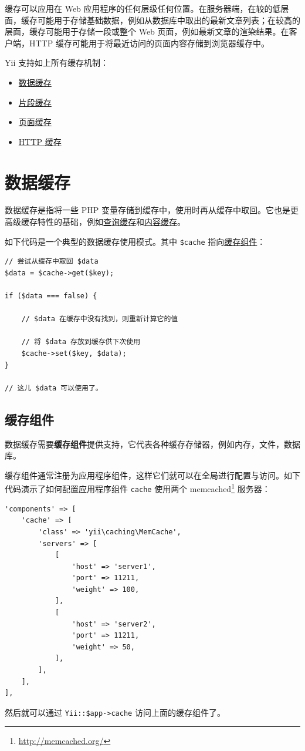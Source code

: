 缓存可以应用在 Web 应用程序的任何层级任何位置。在服务器端，在较的低层面，缓存可能用于存储基础数据，例如从数据库中取出的最新文章列表；在较高的层面，缓存可能用于存储一段或整个 Web 页面，例如最新文章的渲染结果。在客户端，HTTP 缓存可能用于将最近访问的页面内容存储到浏览器缓存中。

Yii 支持如上所有缓存机制：

\begin{itemize}
\item \hyperref[caching-data.md]{数据缓存}
\item \hyperref[caching-fragment.md]{片段缓存}
\item \hyperref[caching-page.md]{页面缓存}
\item \hyperref[caching-http.md]{HTTP 缓存}
\end{itemize}


\label{caching-data.md}\section{数据缓存}
数据缓存是指将一些 PHP 变量存储到缓存中，使用时再从缓存中取回。它也是更高级缓存特性的基础，例如\hyperref[caching-data.md::::query-caching]{查询缓存}和\hyperref[caching-content.md]{内容缓存}。

如下代码是一个典型的数据缓存使用模式。其中 \lstinline|$cache| 指向\hyperref[caching-data.md::::cache-components]{缓存组件}：

\lstset{language=php}\begin{lstlisting}
// 尝试从缓存中取回 $data 
$data = $cache->get($key);

if ($data === false) {

    // $data 在缓存中没有找到，则重新计算它的值

    // 将 $data 存放到缓存供下次使用
    $cache->set($key, $data);
}

// 这儿 $data 可以使用了。
\end{lstlisting}
\subsection{缓存组件 \label{caching-data.md::cache-components}}
数据缓存需要\textbf{缓存组件}提供支持，它代表各种缓存存储器，例如内存，文件，数据库。

缓存组件通常注册为应用程序组件，这样它们就可以在全局进行配置与访问。如下代码演示了如何配置应用程序组件 \lstinline|cache| 使用两个 memcached\footnote{\url{http://memcached.org/}} 服务器：

\lstset{language=php}\begin{lstlisting}
'components' => [
    'cache' => [
        'class' => 'yii\caching\MemCache',
        'servers' => [
            [
                'host' => 'server1',
                'port' => 11211,
                'weight' => 100,
            ],
            [
                'host' => 'server2',
                'port' => 11211,
                'weight' => 50,
            ],
        ],
    ],
],
\end{lstlisting}
然后就可以通过  \lstinline|Yii::$app->cache| 访问上面的缓存组件了。

